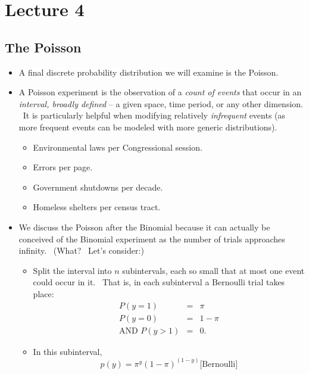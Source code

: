 \documentclass[11pt]{article}
\begin{document}
\section{Lecture 4}

\subsection{The Poisson}

\begin{itemize}
\item A final discrete probability distribution we will examine is the
Poisson.

\item A Poisson experiment is the observation of a \textit{count of events}
that occur in an \textit{interval, broadly defined} -- a given space, time
period, or any other dimension. \ It is particularly helpful when modifying
relatively \textit{infrequent }events (as more frequent events can be
modeled with more generic distributions).

\begin{itemize}
\item Environmental laws per Congressional session.

\item Errors per page.

\item Government shutdowns per decade.

\item Homeless shelters per census tract.
\end{itemize}

\item We discuss the Poisson after the Binomial because it can actually be
conceived of the Binomial experiment as the number of trials approaches
infinity. \ (What? \ Let's consider:)

\begin{itemize}
\item Split the interval into $n$ subintervals, each so small that at most
one event could occur in it. \ That is, in each subinterval a Bernoulli
trial takes place:%
\begin{eqnarray*}
P\left( y=1\right) &=&\pi \\
P\left( y=0\right) &=&1-\pi \\
\text{AND }P\left( y>1\right) &=&0.
\end{eqnarray*}

\item In this subinterval, 
\begin{equation*}
p\left( y\right) =\pi ^{y}\left( 1-\pi \right) ^{\left( 1-y\right) }\text{
[Bernoulli]}
\end{equation*}


\end{itemize}
\end{itemize}
\end{document}
